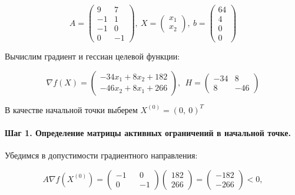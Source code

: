 \begin{equation*}
	A = \begin{pmatrix}
		9 & 7
		\\
		-1 & 1
		\\
		-1 & 0
		\\
		0 & -1
	\end{pmatrix}
	,\ %
	X = \begin{pmatrix}
	x_1 \\ x_2
	\end{pmatrix}
	,\ %
	b = \begin{pmatrix}
		64 \\ 4 \\ 0 \\ 0
	\end{pmatrix}
\end{equation*}

Вычислим градиент и гессиан целевой функции:

\begin{equation*}
	\nabla f(X) = \begin{pmatrix}
		-34 x_1 + 8 x_2 + 182
		\\
		-46 x_2 + 8 x_1 + 266
	\end{pmatrix}%
	,\ \ %
	H = \begin{pmatrix}
		-34 & 8
		\\
		8 & -46	
	\end{pmatrix}
\end{equation*}

В качестве начальной точки выберем $X^{(0)} = (0,\ 0)^T$

\paragraph{Шаг 1. Определение матрицы активных ограничений в начальной точке.}

Убедимся в допустимости градиентного направления:

\begin{equation*}
	A \nabla f(X^{(0)}) = \begin{pmatrix}
	-1 && 0 \\ 0 && -1
	\end{pmatrix}
	\begin{pmatrix}
	182 \\ 266
	\end{pmatrix}
	=
	\begin{pmatrix}
	-182 \\ -266
	\end{pmatrix}
	< 0,
\end{equation*}

